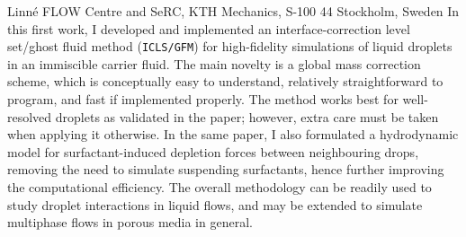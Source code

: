 %
%
%
%
%
%
%
\paperaffiliation
{%
  Linn\'e FLOW Centre and SeRC, KTH Mechanics, S-100 44 Stockholm, Sweden%
}%
%
%
%
%
%
\papernumber{}%
%
%
%
%
%
\papersummary%
{%
In this first work, I developed and implemented an interface-correction level set/ghost fluid method (\texttt{ICLS/GFM}) for high-fidelity simulations of liquid droplets in an immiscible carrier fluid. The main novelty is a global mass correction scheme, which is conceptually easy to understand, relatively straightforward to program, and fast if implemented properly. The method works best for well-resolved droplets as validated in the paper; however, extra care must be taken when applying it otherwise. In the same paper, I also formulated a hydrodynamic model for surfactant-induced depletion forces between neighbouring drops, removing the need to simulate suspending surfactants, hence further improving the computational efficiency. The overall methodology can be readily used to study droplet interactions in liquid flows, and may be extended to simulate multiphase flows in porous media in general.
}%
%
\graphicspath{{paper1/}}%
%
%
%
